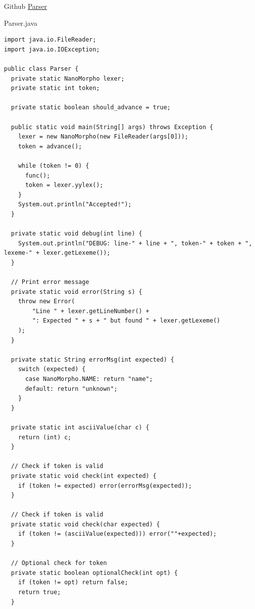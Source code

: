 \documentclass{homework}
\begin{document}

\begin{question}{Github}
  \href{https://github.com/slowpokesheep/thydendur/blob/master/nanomorpho/Parser.java}{Parser}\\
\end{question}

\begin{question}{Parser.java}
\end{question}
\begin{answer}
\begin{verbatim}
import java.io.FileReader;
import java.io.IOException;

public class Parser {
  private static NanoMorpho lexer;
  private static int token;

  private static boolean should_advance = true;

  public static void main(String[] args) throws Exception {
    lexer = new NanoMorpho(new FileReader(args[0]));
    token = advance();

    while (token != 0) {
      func();
      token = lexer.yylex();
    }
    System.out.println("Accepted!");
  }

  private static void debug(int line) {
    System.out.println("DEBUG: line-" + line + ", token-" + token + ", lexeme-" + lexer.getLexeme());
  }

  // Print error message
  private static void error(String s) {
    throw new Error(
        "Line " + lexer.getLineNumber() +
        ": Expected " + s + " but found " + lexer.getLexeme()
    );
  }

  private static String errorMsg(int expected) {
    switch (expected) {
      case NanoMorpho.NAME: return "name";
      default: return "unknown";
    }
  }

  private static int asciiValue(char c) {
    return (int) c;
  }

  // Check if token is valid
  private static void check(int expected) {
    if (token != expected) error(errorMsg(expected));
  }

  // Check if token is valid
  private static void check(char expected) {
    if (token != (asciiValue(expected))) error(""+expected);
  }

  // Optional check for token
  private static boolean optionalCheck(int opt) {
    if (token != opt) return false;
    return true;
  }


\end{verbatim}
\end{answer}
\end{document}
